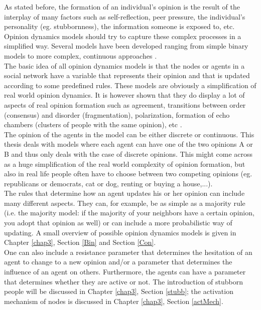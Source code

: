 \documentclass[11 pt , letterpaper , twoside , openright]{book}
\begin{document}
As stated before, the formation of an individual's opinion is the result of the interplay of many factors such as self-reflection, peer pressure, the individual's personality (eg. stubbornness), the information someone is exposed to, etc.  Opinion dynamics models should try to capture these complex processes in a simplified way. Several models have been developed ranging from simple binary models to more complex, continuous approaches \cite{Sirbu2016}.\\
The basic idea of all opinion dynamics models is that the nodes or agents in a social network have a variable that represents their opinion and that is updated according to some predefined rules. These models are obviously a simplification of real world opinion dynamics. It is however shown that they do display a lot of aspects of real opinion formation such as agreement, transitions between order (consensus) and disorder (fragmentation), polarization, formation of echo chambers (clusters of people with the same opinion), etc \cite{Sirbu2016}. \\
\newline
The opinion of the agents in the model can be either discrete or continuous. This thesis deals with models where each agent can have one of the two opinions A or B and thus only deals with the case of discrete opinions. This might come across as a huge simplification of the real world complexity of opinion formation, but also in real life people often have to choose between two competing opinions (eg. republicans or democrats, cat or dog, renting or buying a house,...). \\
\newline
The rules that determine how an agent updates his or her opinion can include many different aspects. They can, for example, be as simple as a majority rule (i.e. the majority model: if the majority of your neighbors have a certain opinion, you adopt that opinion as well) or can include a more probabilistic way of updating. A small overview of possible opinion dynamics models is given in Chapter \ref{chap3}, Section \ref{Bin} and Section \ref{Con}. \\
One can also include a resistance parameter that determines the hesitation of an agent to change to a new opinion and/or a parameter that determines the influence of an agent on others. Furthermore, the agents can have a parameter that determines whether they are active or not. The introduction of stubborn people will be discussed in Chapter \ref{chap3}, Section \ref{stubb}; the activation mechanism of nodes is discussed in Chapter \ref{chap3}, Section \ref{actMech}.\\
\end{document}
